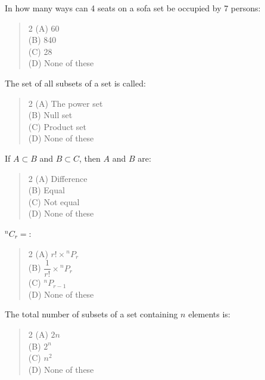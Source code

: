 \documentclass[11pt,a4paper]{article}
\begin{document}
\begin{mcqlist}
\item In how many ways can 4 seats on a sofa set be occupied by 7 persons:
\begin{quote}\begin{multicols}{2}
\noindent (A) 60 \\
(B) 840 \\
(C) 28 \\
(D) None of these
\end{multicols}\end{quote}

\item The set of all subsets of a set is called:
\begin{quote}\begin{multicols}{2}
\noindent (A) The power set \\
(B) Null set \\
(C) Product set \\
(D) None of these
\end{multicols}\end{quote}

\item If $A\subset B$ and $B\subset C$, then $A$ and $B$ are:
\begin{quote}\begin{multicols}{2}
\noindent (A) Difference \\
(B) Equal \\
(C) Not equal \\
(D) None of these
\end{multicols}\end{quote}

\item ${}^{n}C_r=$\underline{\hspace{1cm}}:
\begin{quote}\begin{multicols}{2}
\noindent (A) $r! \times {}^{n}P_r$ \\
(B) $\dfrac{1}{r!}\times {}^{n}P_r$ \\
(C) ${}^{n}P_{r-1}$ \\
(D) None of these
\end{multicols}\end{quote}

\item The total number of subsets of a set containing $n$ elements is:
\begin{quote}\begin{multicols}{2}
\noindent (A) $2n$ \\
(B) $2^n$ \\
(C) $n^2$ \\
(D) None of these
\end{multicols}\end{quote}


\end{mcqlist}
\end{document}
